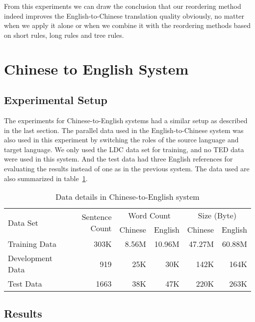 %

From this experiments we can draw the conclusion that our reordering method indeed improves the English-to-Chinese translation quality obviously, no matter when we apply it alone or when we combine it with the reordering methods based on short rules, long rules and tree rules. %

\section{Chinese to English System}
\label{ch:Evaluation:sec:zhen2}


\subsection{Experimental Setup}

The experiments for Chinese-to-English systems had a similar setup as described in the last section. The parallel data used in the English-to-Chinese system was also used in this experiment by switching the roles of the source language and target language. We only used the \acs{LDC} data set for training, and no \acs{TED} data were used in this system. And the test data had three English references for evaluating the results instead of one as in the previous system. The data used are also summarized in table~\ref{dzhen2}.


\begin{table}[H]
\centering
\begin{tabular}{|l|r|r|r|r|r|}
\hline
\multirow{2}{*}{Data Set} & \multirow{2}{*}{Sentence Count} & \multicolumn{2}{c|}{Word Count} & \multicolumn{2}{c|}{Size (Byte)}\\ \cline{3-6}
& & Chinese & English & Chinese & English \\
\hline
Training Data & 303K & 8.56M & 10.96M & 47.27M & 60.88M\\ \hline
Development Data & 919 & 25K & 30K & 142K & 164K \\ \hline
Test Data & 1663 & 38K & 47K & 220K & 263K \\ \hline
\end{tabular}
\caption{Data details in Chinese-to-English system}
\label{dzhen2}
\end{table}

\subsection{Results}

